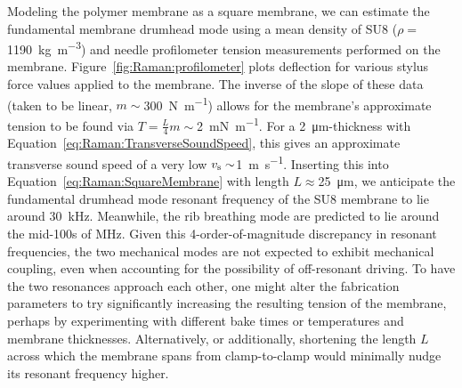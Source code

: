 Modeling the polymer membrane as a square membrane, we can estimate the fundamental membrane drumhead mode using a mean density of SU8 (\(\rho=\)\SI{1190}{\kilo\gram\per\cubic\meter}) \cite{roch2003fabrication} and needle profilometer tension measurements performed on the membrane. Figure~\ref{fig:Raman:profilometer} plots deflection for various stylus force values applied to the membrane. The inverse of the slope of these data (taken to be linear, \(m\sim\)\SI{300}{\newton\per\meter}) allows for the membrane's approximate tension to be found via \(T=\frac{L}{4}m\sim\)\SI{2}{\milli\newton\per\meter}. For a \SI{2}{\micro\meter}-thickness with Equation~\ref{eq:Raman:TransverseSoundSpeed}, this gives an approximate transverse sound speed of a very low \(v_{\rm s}\sim\)\SI{1}{\meter\per\second}. Inserting this into Equation~\ref{eq:Raman:SquareMembrane} with length \(L\approx\)\SI{25}{\micro\meter}, we anticipate the fundamental drumhead mode resonant frequency of the SU8 membrane to lie around \SI{30}{\kilo\hertz}. Meanwhile, the rib breathing mode are predicted to lie around the mid-100s of \si{\mega\hertz}. Given this 4-order-of-magnitude discrepancy in resonant frequencies, the two mechanical modes are not expected to exhibit mechanical coupling, even when accounting for the possibility of off-resonant driving. To have the two resonances approach each other, one might alter the fabrication parameters to try significantly increasing the resulting tension of the membrane, perhaps by experimenting with different bake times or temperatures and membrane thicknesses. Alternatively, or additionally, shortening the length \(L\) across which the membrane spans from clamp-to-clamp would minimally nudge its resonant frequency higher.


